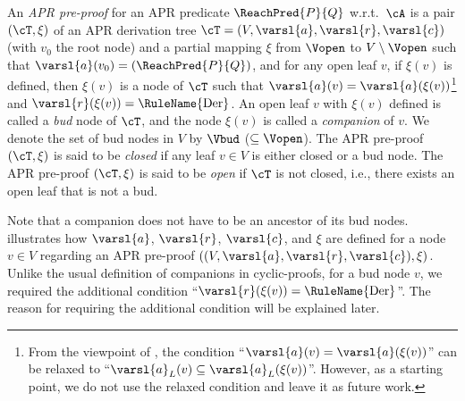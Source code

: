 \begin{definition}
	\label{def:APR-pre-proof}
	An \emph{APR pre-proof} for an APR predicate $\ReachPred{P}{Q}$ w.r.t.\ $\cA$ is a pair $(\cT,\xi)$ of an APR derivation tree $\cT=(V,\varsl{a},\varsl{r},\varsl{c})$ (with $v_0$ the root node) and a partial mapping $\xi$ from $\Vopen$ to $V\setminus \Vopen$
	such that
	$\varsl{a}(v_0) = (\ReachPred{P}{Q})$,
	and
	for any open leaf $v$, if $\xi(v)$ is defined, then
	$\xi(v)$ is a node of $\cT$ such that $\varsl{a}(v)=\varsl{a}(\xi(v))$\footnote{\label{fnt:relaxation-of-bud-companion-relationships}
		From the viewpoint of , the condition ``$\varsl{a}(v)=\varsl{a}(\xi(v))$'' can be relaxed to
		``$\varsl{a}_L(v) \subseteq \varsl{a}_L(\xi(v))$''.
		However, as a starting point, we do not use the relaxed condition and leave it as future work.}
	and $\varsl{r}(\xi(v)) = \mbox{\rm\RuleName{Der}}$.
	An open leaf $v$ with $\xi(v)$ defined is called a \emph{bud} node of $\cT$, and the node $\xi(v)$ is called a \emph{companion} of $v$.
	We denote the set of bud nodes in $V$ by $\Vbud$ ($\subseteq \Vopen$).
	The APR pre-proof $(\cT,\xi)$ is said to be \emph{closed} if
	any leaf $v \in V$ is either closed or a bud node.
	The APR pre-proof $(\cT,\xi)$ is said to be \emph{open} if $\cT$ is not closed, i.e., there exists an open leaf that is not a bud.
\end{definition}
Note that a companion does not have to be an ancestor of its bud nodes.
 illustrates how $\varsl{a}$, $\varsl{r}$, $\varsl{c}$, and $\xi$ are defined for a node $v \in V$ regarding an APR pre-proof $((V,\varsl{a},\varsl{r},\varsl{c}),\xi)$.
Unlike the usual definition of companions in cyclic-proofs, for a bud node $v$, we required the additional condition ``$\varsl{r}(\xi(v)) = \mbox{\rm\RuleName{Der}}$''.
The reason for requiring the additional condition will be explained later.

